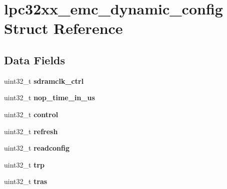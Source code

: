 \hypertarget{structlpc32xx__emc__dynamic__config}{}\section{lpc32xx\+\_\+emc\+\_\+dynamic\+\_\+config Struct Reference}
\label{structlpc32xx__emc__dynamic__config}
\subsection*{Data Fields}
\begin{DoxyCompactItemize}
\item 
\mbox{\label{structlpc32xx__emc__dynamic__config_a634316b36bd0bf0075361f7150c734b8}} 
uint32\+\_\+t {\bfseries sdramclk\+\_\+ctrl}
\item 
\mbox{\label{structlpc32xx__emc__dynamic__config_a8e5ac156837e65198560e94b8750f3c0}} 
uint32\+\_\+t {\bfseries nop\+\_\+time\+\_\+in\+\_\+us}
\item 
\mbox{\label{structlpc32xx__emc__dynamic__config_a8c0990dd0049da2345258e764152809b}} 
uint32\+\_\+t {\bfseries control}
\item 
\mbox{\label{structlpc32xx__emc__dynamic__config_ab2ac605104e8fb3801a1d7bb890b5c55}} 
uint32\+\_\+t {\bfseries refresh}
\item 
\mbox{\label{structlpc32xx__emc__dynamic__config_adeb506f934df85b4793719e40d62cedf}} 
uint32\+\_\+t {\bfseries readconfig}
\item 
\mbox{\label{structlpc32xx__emc__dynamic__config_aefeee9b8fe8772e2464ad0e9cc42ff38}} 
uint32\+\_\+t {\bfseries trp}
\item 
\mbox{\label{structlpc32xx__emc__dynamic__config_a1c8efee7de47f6abee9d3084deeba9d3}} 
uint32\+\_\+t {\bfseries tras}
\item 
\mbox{\label{structlpc32xx__emc__dynamic__config_afb6f6f274beed3bf9445c3754d15ad93}} 

\end{DoxyCompactItemize}
